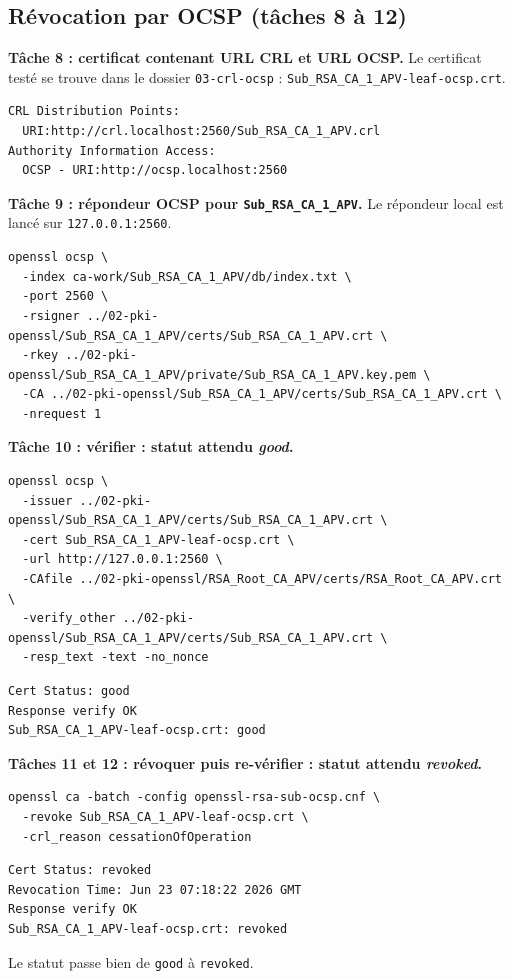 \documentclass[11pt,a4paper]{article}
\newcommand{\tri}{\texttt{APV}}
\newcommand{\fichier}[1]{\texttt{#1}}
\begin{document}
\subsection{Révocation par OCSP (tâches 8 à 12)}

\textbf{Tâche 8 : certificat contenant URL CRL et URL OCSP.}
Le certificat testé se trouve dans le dossier \fichier{03-crl-ocsp} :
\fichier{Sub\_RSA\_CA\_1\_\tri-leaf-ocsp.crt}.
\begin{lstlisting}[style=out]
CRL Distribution Points:
  URI:http://crl.localhost:2560/Sub_RSA_CA_1_APV.crl
Authority Information Access:
  OCSP - URI:http://ocsp.localhost:2560
\end{lstlisting}

\textbf{Tâche 9 : répondeur OCSP pour \texttt{Sub\_RSA\_CA\_1\_\tri}.}
Le répondeur local est lancé sur \texttt{127.0.0.1:2560}.
\begin{lstlisting}[style=cmd]
openssl ocsp \
  -index ca-work/Sub_RSA_CA_1_APV/db/index.txt \
  -port 2560 \
  -rsigner ../02-pki-openssl/Sub_RSA_CA_1_APV/certs/Sub_RSA_CA_1_APV.crt \
  -rkey ../02-pki-openssl/Sub_RSA_CA_1_APV/private/Sub_RSA_CA_1_APV.key.pem \
  -CA ../02-pki-openssl/Sub_RSA_CA_1_APV/certs/Sub_RSA_CA_1_APV.crt \
  -nrequest 1
\end{lstlisting}

\textbf{Tâche 10 : vérifier : statut attendu \emph{good}.}
\begin{lstlisting}[style=cmd]
openssl ocsp \
  -issuer ../02-pki-openssl/Sub_RSA_CA_1_APV/certs/Sub_RSA_CA_1_APV.crt \
  -cert Sub_RSA_CA_1_APV-leaf-ocsp.crt \
  -url http://127.0.0.1:2560 \
  -CAfile ../02-pki-openssl/RSA_Root_CA_APV/certs/RSA_Root_CA_APV.crt \
  -verify_other ../02-pki-openssl/Sub_RSA_CA_1_APV/certs/Sub_RSA_CA_1_APV.crt \
  -resp_text -text -no_nonce
\end{lstlisting}
\begin{lstlisting}[style=out]
Cert Status: good
Response verify OK
Sub_RSA_CA_1_APV-leaf-ocsp.crt: good
\end{lstlisting}

\textbf{Tâches 11 et 12 : révoquer puis re-vérifier : statut attendu \emph{revoked}.}
\begin{lstlisting}[style=cmd]
openssl ca -batch -config openssl-rsa-sub-ocsp.cnf \
  -revoke Sub_RSA_CA_1_APV-leaf-ocsp.crt \
  -crl_reason cessationOfOperation
\end{lstlisting}
\begin{lstlisting}[style=out]
Cert Status: revoked
Revocation Time: Jun 23 07:18:22 2026 GMT
Response verify OK
Sub_RSA_CA_1_APV-leaf-ocsp.crt: revoked
\end{lstlisting}
Le statut passe bien de \texttt{good} à \texttt{revoked}.
\end{document}
